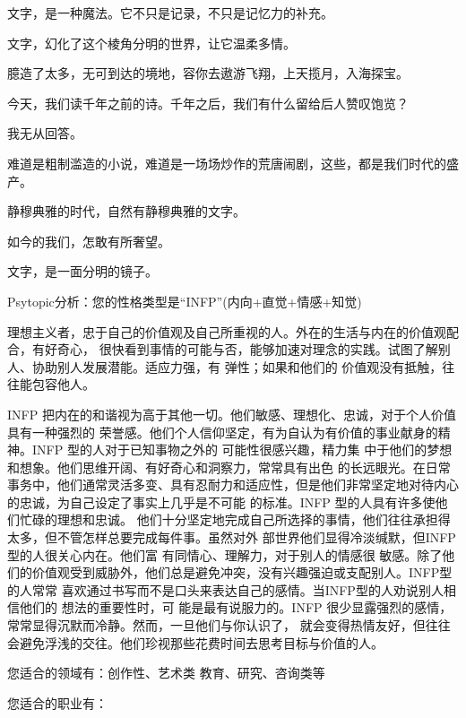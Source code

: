 \documentclass[12pt,a4paper]{article}
\def\blankrev{\vspace{1ex}}									%
\begin{document}
		\blankrev
		文字，是一种魔法。它不只是记录，不只是记忆力的补充。\par
		文字，幻化了这个棱角分明的世界，让它温柔多情。\par
		臆造了太多，无可到达的境地，容你去遨游飞翔，上天揽月，入海探宝。\par
		今天，我们读千年之前的诗。千年之后，我们有什么留给后人赞叹饱览？\par
		我无从回答。\par
		难道是粗制滥造的小说，难道是一场场炒作的荒唐闹剧，这些，都是我们时代的盛产。

		\blankrev
		静穆典雅的时代，自然有静穆典雅的文字。\par
		如今的我们，怎敢有所奢望。\par
		文字，是一面分明的镜子。

	\endwriting



		Psytopic分析：您的性格类型是“INFP”(内向+直觉+情感+知觉)

		理想主义者，忠于自己的价值观及自己所重视的人。外在的生活与内在的价值观配合，有好奇心，
	很快看到事情的可能与否，能够加速对理念的实践。试图了解别人、协助别人发展潜能。适应力强，有
	弹性；如果和他们的 价值观没有抵触，往往能包容他人。

		INFP 把内在的和谐视为高于其他一切。他们敏感、理想化、忠诚，对于个人价值具有一种强烈的
	荣誉感。他们个人信仰坚定，有为自认为有价值的事业献身的精神。INFP 型的人对于已知事物之外的
	可能性很感兴趣，精力集 中于他们的梦想和想象。他们思维开阔、有好奇心和洞察力，常常具有出色
	的长远眼光。在日常事务中，他们通常灵活多变、具有忍耐力和适应性，但是他们非常坚定地对待内心
	的忠诚，为自己设定了事实上几乎是不可能 的标准。INFP 型的人具有许多使他们忙碌的理想和忠诚。
	他们十分坚定地完成自己所选择的事情，他们往往承担得太多，但不管怎样总要完成每件事。虽然对外
	部世界他们显得冷淡缄默，但INFP型的人很关心内在。他们富 有同情心、理解力，对于别人的情感很
	敏感。除了他们的价值观受到威胁外，他们总是避免冲突，没有兴趣强迫或支配别人。INFP型的人常常
	喜欢通过书写而不是口头来表达自己的感情。当INFP型的人劝说别人相信他们的 想法的重要性时，可
	能是最有说服力的。INFP 很少显露强烈的感情，常常显得沉默而冷静。然而，一旦他们与你认识了，
	就会变得热情友好，但往往会避免浮浅的交往。他们珍视那些花费时间去思考目标与价值的人。

		您适合的领域有：创作性、艺术类 教育、研究、咨询类等

		您适合的职业有：
\end{document}
